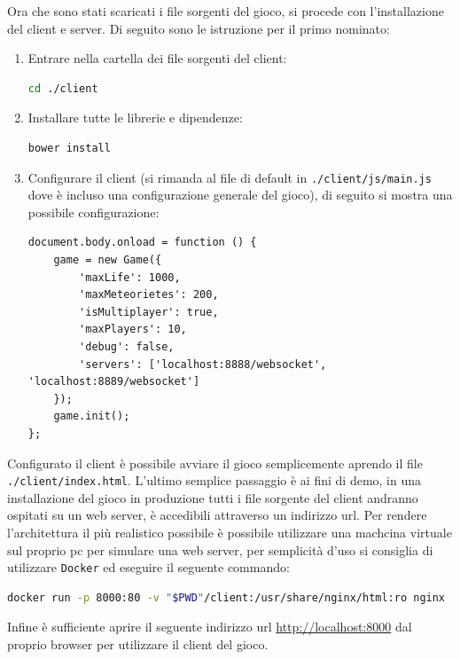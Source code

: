 \documentclass[paper=a4, fontsize=11pt]{scrartcl} %
\numberwithin{equation}{section} %
\numberwithin{figure}{section} %
\numberwithin{table}{section} %
\begin{document}
Ora che sono stati scaricati i file sorgenti del gioco, si procede con l'installazione del client e server. Di seguito sono le istruzione per il primo nominato:
\begin{enumerate}  
\item
Entrare nella cartella dei file sorgenti del client:
\begin{lstlisting}[language=bash]
cd ./client
\end{lstlisting}

\item
Installare tutte le librerie e dipendenze:
\begin{lstlisting}[language=bash]
bower install
\end{lstlisting}

\item
Configurare il client (si rimanda al file di default in \texttt{./client/js/main.js} dove è incluso una configurazione generale del gioco), di seguito si mostra una possibile configurazione:
\begin{lstlisting}
document.body.onload = function () {
    game = new Game({
        'maxLife': 1000,
        'maxMeteorietes': 200,
        'isMultiplayer': true,
        'maxPlayers': 10,
        'debug': false,
        'servers': ['localhost:8888/websocket', 'localhost:8889/websocket']
    });
    game.init();
};
\end{lstlisting}
\end{enumerate}

Configurato il client è possibile avviare il gioco semplicemente aprendo il file \texttt{./client/index.html}. L'ultimo semplice passaggio è ai fini di demo, in una
installazione del gioco in produzione tutti i file sorgente del client andranno ospitati su un web server, è accedibili attraverso un indirizzo url.
Per rendere l'architettura il più realistico possibile è possibile utilizzare una machcina virtuale sul proprio pc per simulare una web server, per semplicità d'uso
si consiglia di utilizzare \texttt{Docker}\cite{docker} ed eseguire il seguente commando:
\begin{lstlisting}[language=bash]
docker run -p 8000:80 -v "$PWD"/client:/usr/share/nginx/html:ro nginx
\end{lstlisting}
Infine è sufficiente aprire il seguente indirizzo url \url{http://localhost:8000} dal proprio browser per utilizzare il client del gioco.
\end{document}
